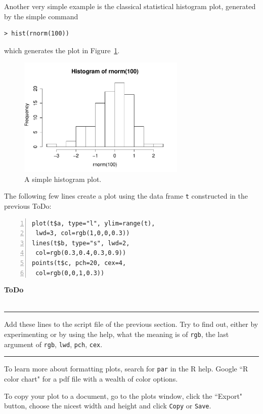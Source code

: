 \documentclass[a4paper,11pt,twocolumn,tablecaptionabove]{scrartcl}
\newenvironment{ToDo} {%
  \begin{flushright}
    \hfill
    \begin{minipage}{0.95\columnwidth}         %
    \textsf{\textbf{ToDo}} \\
      \vspace{-0.85cm}\\
      {\color{Gray}\rule[-0.1cm]{\columnwidth}{1.5pt}}} { %
      {\color{Gray} \rule[0.3cm]{\columnwidth}{1.5pt}}
    \end{minipage}
    \vspace{1em}
  \end{flushright}
  }
\begin{document}
Another very simple example is the classical statistical histogram plot, generated by the
simple command
\begin{Verbatim}[frame=single,gobble=0]
  > hist(rnorm(100))
\end{Verbatim}
which generates the plot in Figure~\ref{fig:hist}.
\begin{figure}[h]
  \centering
  \includegraphics[width=8cm]{img/hist.pdf}
  \caption{A simple histogram plot.}
  \label{fig:hist}
\end{figure}

\noindent The following few lines create a plot using the data frame \texttt{t}
constructed in the previous ToDo:
\begin{Verbatim}[frame=single,numbers=left,gobble=0, xleftmargin=0.35cm, numbersep=0.1cm]
plot(t$a, type="l", ylim=range(t), 
 lwd=3, col=rgb(1,0,0,0.3))
lines(t$b, type="s", lwd=2, 
 col=rgb(0.3,0.4,0.3,0.9))
points(t$c, pch=20, cex=4, 
 col=rgb(0,0,1,0.3))
\end{Verbatim} 

\begin{ToDo}
  Add these lines to the script file of the previous section. Try to
  find out, either by experimenting or by using the help, what the
  meaning is of \texttt{rgb}, the last argument of \texttt{rgb},
  \texttt{lwd}, \texttt{pch}, \texttt{cex}.\\
\end{ToDo}

To learn more about formatting plots, search for \texttt{par} in the R help. 
Google ``R color chart" for a pdf file with a wealth of color options.

To copy your plot to a document, go to the plots window, click the ``Export" button, choose the nicest width and height and click \texttt{Copy} or \texttt{Save}. 


\end{document}
